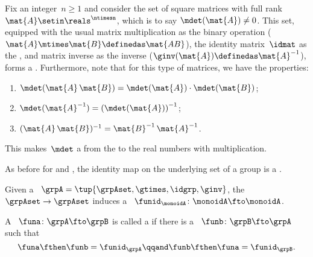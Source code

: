 \begin{example}
    \label{exa:square-full}
    Fix an integer~$n\geq1 $ and consider the set of square matrices with full rank~$\mat{A} \setin \reals^{\ntimesn}$, which is to say $\mdet(\mat{A}) \neq 0$.
    This set, equipped with the usual matrix multiplication as the binary operation ($\mat{A}\mtimes \mat{B}\definedas \mat{AB}$), the identity matrix~$\idmat$ as the , and matrix inverse as the inverse ($\ginv(\mat{A})\definedas \mat{A}^{-1}$), forms a .
    Furthermore, note that for this type of matrices, we have the properties:
    \begin{enumerate}
        \item $\mdet(\mat{A} \, \mat{B}) = \mdet(\mat{A}) \cdot  \mdet(\mat{B})$;
        \item $\mdet(\mat{A}^{-1}) = \left( \mdet(\mat{A}) \right) ^ {-1}$;
        \item $(\mat{A}\,\mat{B})^{-1} = {\mat{B}^{-1} \, \mat{A}^{-1}}$.
    \end{enumerate}
    This makes~$\mdet$ a  from the  to the real numbers with multiplication.
\end{example}

As before for  and , the identity map on the underlying set of a group is a .

\begin{ctdefinition}
    \label{def:identity-grp-mor}
    Given a ~$\grpA =  \tup{\grpAset, \gtimes, \idgrp, \ginv}$, the  $\grpAset \to \grpAset$ induces a ~$\funid_\monoidA\colon \monoidA \fto \monoidA$.
\end{ctdefinition}

\begin{ctdefinition}
    \label{def:grp-iso}
    A ~$\funa\colon \grpA \fto \grpB$ is called a  if there is a ~$\funb\colon \grpB \fto \grpA$ such that
    \begin{equation}
        \funa \fthen \funb = \funid_\grpA \qqand \funb \fthen \funa = \funid_\grpB.
    \end{equation}
\end{ctdefinition}


